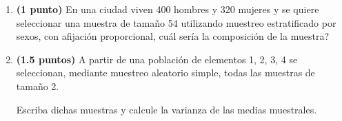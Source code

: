 
\begin{enumerate}[label=\alph*)]
\item \textbf{(1 punto)} En una ciudad viven 400 hombres y 320 mujeres y se quiere seleccionar una muestra de tamaño 54 utilizando muestreo estratificado por sexos, con afijación proporcional, \textquestiondown{}cuál sería la composición de la muestra?
\item \textbf{(1.5 puntos)} A partir de una población de elementos 1, 2, 3, 4 se seleccionan, mediante muestreo aleatorio simple, todas las muestras de tamaño 2.

Escriba dichas muestras y calcule la varianza de las medias muestrales.
\end{enumerate}
